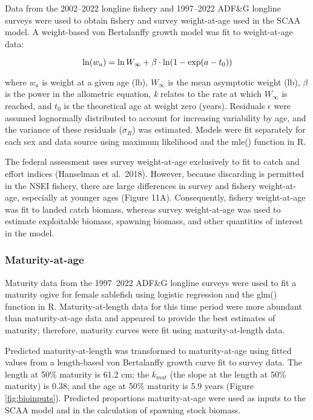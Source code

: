 \documentclass[
]{article}
\begin{document}
Data from the 2002--2022 longline fishery and 1997--2022 ADF\&G longline surveys were used to obtain fishery and survey weight-at-age used in the SCAA model. A weight-based von Bertalanffy growth model was fit to weight-at-age data:

\[
\begin{equation}
\ln(w_a)=\ln W_{\infty}+\beta \cdot \ln (1-\exp (a-t_0)) \\
\label{eq:weightvonb}
\end{equation}
\]

where \(w_a\) is weight at a given age (lb), \(W_{\infty}\) is the mean asymptotic weight (lb), \(\beta\) is the power in the allometric equation, \emph{k} relates to the rate at which \(W_{\infty}\) is reached, and \(t_0\) is the theoretical age at weight zero (years). Residuals \(\epsilon\) were assumed lognormally distributed to account for increasing variability by age, and the variance of these residuals (\(\sigma_R\)) was estimated. Models were fit separately for each sex and data source using maximum likelihood and the mle() function in R.

The federal assessment uses survey weight-at-age exclusively to fit to catch and effort indices (Hanselman et al.~2018). However, because discarding is permitted in the NSEI fishery, there are large differences in survey and fishery weight-at-age, especially at younger ages (Figure 11A). Consequently, fishery weight-at-age was fit to landed catch biomass, whereas survey weight-at-age was used to estimate exploitable biomass, spawning biomass, and other quantities of interest in the model.

\hypertarget{maturity-at-age}{%
\subsubsection{Maturity-at-age}\label{maturity-at-age}}

Maturity data from the 1997--2022 ADF\&G longline surveys were used to fit a maturity ogive for female sablefish using logistic regression and the glm() function in R. Maturity-at-length data for this time period were more abundant than maturity-at-age data and appeared to provide the best estimates of maturity; therefore, maturity curves were fit using maturity-at-length data.

Predicted maturity-at-length was transformed to maturity-at-age using fitted values from a length-based von Bertalanffy growth curve fit to survey data. The length at 50\% maturity is 61.2 cm; the \(k_{mat}\) (the slope at the length at 50\% maturity) is 0.38; and the age at 50\% maturity is 5.9 years (Figure \ref{fig:bioinputs}). Predicted proportions maturity-at-age were used as inputs to the SCAA model and in the calculation of spawning stock biomass.
\end{document}
